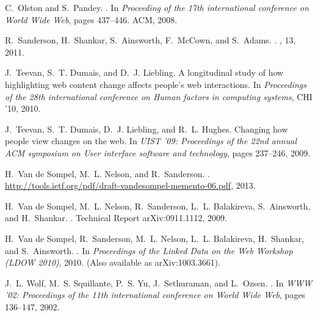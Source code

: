 \documentclass[runningheads,a4paper]{llncs}
\begin{document}
\begin{thebibliography}{10}
C.~Olston and S.~Pandey.
.
\newblock In {\em Proceeding of the 17th international conference on World Wide
  Web}, pages 437--446. ACM, 2008.

R.~Sanderson, H.~Shankar, S.~Ainsworth, F.~McCown, and S.~Adams.
.
, 13, 2011.

J.~Teevan, S.~T. Dumais, and D.~J. Liebling.
\newblock A longitudinal study of how highlighting web content change affects
  people's web interactions.
\newblock In {\em Proceedings of the 28th international conference on Human
  factors in computing systems}, CHI '10, 2010.

J.~Teevan, S.~T. Dumais, D.~J. Liebling, and R.~L. Hughes.
\newblock Changing how people view changes on the web.
\newblock In {\em UIST '09: Proceedings of the 22nd annual ACM symposium on
  User interface software and technology}, pages 237--246, 2009.

H.~{Van de Sompel}, M.~L. Nelson, and R.~Sanderson.
.
\newblock \url{http://tools.ietf.org/pdf/draft-vandesompel-memento-06.pdf},
  2013.

H.~{Van de Sompel}, M.~L. Nelson, R.~Sanderson, L.~L. Balakireva, S.~Ainsworth,
  and H.~Shankar.
.
\newblock Technical Report arXiv:0911.1112, 2009.

H.~{Van de Sompel}, R.~Sanderson, M.~L. Nelson, L.~L. Balakireva, H.~Shankar,
  and S.~Ainsworth.
.
\newblock In {\em Proceedings of the Linked Data on the Web Workshop (LDOW
  2010)}, 2010.
\newblock (Also available as arXiv:1003.3661).

J.~L. Wolf, M.~S. Squillante, P.~S. Yu, J.~Sethuraman, and L.~Ozsen.
.
\newblock In {\em WWW '02: Proceedings of the 11th international conference on
  World Wide Web}, pages 136--147, 2002.

\end{thebibliography}
\end{document}
